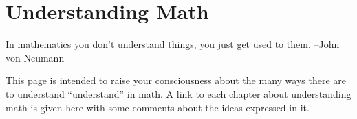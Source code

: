\section{Understanding Math}
In mathematics you don’t understand things, you just get used to them. –John
von Neumann

This page is intended to raise your consciousness about the many ways there are
to understand “understand” in math. A link to each chapter about understanding
math is given here with some comments about the ideas expressed in it.
